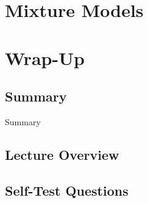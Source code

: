 \section{Mixture Models}

\subsection{}

% 
\begin{frame}{}{}

\end{frame}



\section{Wrap-Up}

\subsection{Summary}

\begin{frame}{Summary}{}

\end{frame}


\subsection{Lecture Overview}



\subsection{Self-Test Questions}

